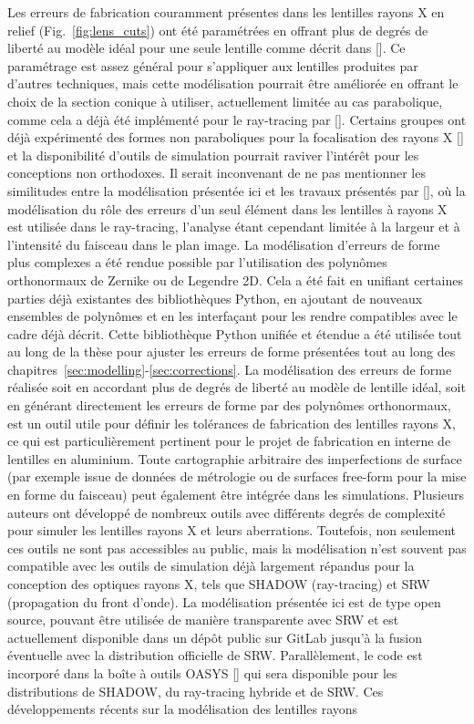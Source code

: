 \begin{refsection}
Les erreurs de fabrication couramment présentes dans les lentilles rayons X en relief (Fig.~\ref{fig:lens_cuts}) ont été paramétrées en offrant plus de degrés de liberté au modèle idéal pour une seule lentille comme décrit dans [\cite{Baltser2011}]. Ce paramétrage est assez général pour s'appliquer aux lentilles produites par d'autres techniques, mais cette modélisation pourrait être améliorée en offrant le choix de la section conique à utiliser, actuellement limitée au cas parabolique, comme cela a déjà été implémenté pour le ray-tracing par [\cite{SanchezdelRio2012,Andrejczuk2010}]. Certains groupes ont déjà expérimenté des formes non paraboliques pour la focalisation des rayons X [\cite{Alianelli2007,Evans-Lutterodt2003, Alianelli2015, Sutter2017}] et la disponibilité d'outils de simulation pourrait raviver l'intérêt pour les conceptions non orthodoxes. Il serait inconvenant de ne pas mentionner les similitudes entre la modélisation présentée ici et les travaux présentés par [\cite{Andrejczuk2010}], où la modélisation du rôle des erreurs d'un seul élément dans les lentilles à rayons X est utilisée dans le ray-tracing, l'analyse étant cependant limitée à la largeur et à l'intensité du faisceau dans le plan image. La modélisation d'erreurs de forme plus complexes a été rendue possible par l'utilisation des polynômes orthonormaux de Zernike ou de Legendre 2D. Cela a été fait en unifiant certaines parties déjà existantes des bibliothèques Python, en ajoutant de nouveaux ensembles de polynômes et en les interfaçant pour les rendre compatibles avec le cadre déjà décrit. Cette bibliothèque Python unifiée et étendue a été utilisée tout au long de la thèse pour ajuster les erreurs de forme présentées tout au long des chapitres~\ref{sec:modelling}-\ref{sec:corrections}. La modélisation des erreurs de forme réalisée soit en accordant plus de degrés de liberté au modèle de lentille idéal, soit en générant directement les erreurs de forme par des polynômes orthonormaux, est un outil utile pour définir les tolérances de fabrication des lentilles rayons X, ce qui est particulièrement pertinent pour le projet de fabrication en interne de lentilles en aluminium. Toute cartographie arbitraire des imperfections de surface (par exemple issue de données de métrologie ou de surfaces free-form pour la mise en forme du faisceau) peut également être intégrée dans les simulations. Plusieurs auteurs ont développé de nombreux outils avec différents degrés de complexité pour simuler les lentilles rayons X et leurs aberrations. Toutefois, non seulement ces outils ne sont pas accessibles au public, mais la modélisation n'est souvent pas compatible avec les outils de simulation déjà largement répandus pour la conception des optiques rayons X, tels que SHADOW (ray-tracing) et SRW (propagation du front d'onde). La modélisation présentée ici est de type open source, pouvant être utilisée de manière transparente avec SRW et est actuellement disponible dans un dépôt public sur GitLab jusqu'à la fusion éventuelle avec la distribution officielle de SRW. Parallèlement, le code est incorporé dans la boîte à outils OASYS [\cite{Rebuffi2017}] qui sera disponible pour les distributions de SHADOW, du ray-tracing hybride et de SRW. Ces développements récents sur la modélisation des lentilles rayons 
\end{refsection}
